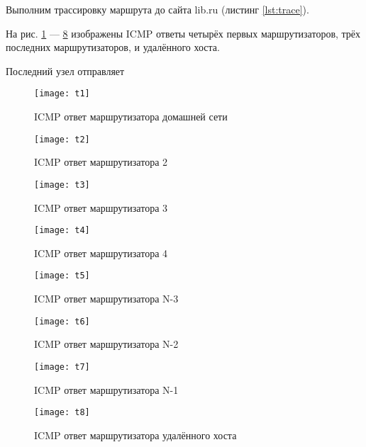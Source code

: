 Выполним трассировку маршрута до сайта lib.ru (листинг \ref{lst:trace}).



На рис. \ref{fig:t1} --- \ref{fig:t8} изображены ICMP ответы четырёх первых маршрутизаторов, трёх последних маршрутизаторов, и удалённого хоста.

Последний узел отправляет 

\begin{figure}[H]
	\centering
	\texttt{[image: t1]}
	\caption{ICMP ответ маршрутизатора домашней сети}
	\label{fig:t1}
\end{figure}

\begin{figure}[H]
	\centering
	\texttt{[image: t2]}
	\caption{ICMP ответ маршрутизатора 2}
	\label{fig:t2}
\end{figure}

\begin{figure}[H]
	\centering
	\texttt{[image: t3]}
	\caption{ICMP ответ маршрутизатора 3}
	\label{fig:t3}
\end{figure}

\begin{figure}[H]
	\centering
	\texttt{[image: t4]}
	\caption{ICMP ответ маршрутизатора 4}
	\label{fig:t4}
\end{figure}

\begin{figure}[H]
	\centering
	\texttt{[image: t5]}
	\caption{ICMP ответ маршрутизатора N-3}
	\label{fig:t5}
\end{figure}

\begin{figure}[H]
	\centering
	\texttt{[image: t6]}
	\caption{ICMP ответ маршрутизатора N-2}
	\label{fig:t6}
\end{figure}

\begin{figure}[H]
	\centering
	\texttt{[image: t7]}
	\caption{ICMP ответ маршрутизатора N-1}
	\label{fig:t7}
\end{figure}

\begin{figure}[H]
	\centering
	\texttt{[image: t8]}
	\caption{ICMP ответ маршрутизатора удалённого хоста}
	\label{fig:t8}
\end{figure}

